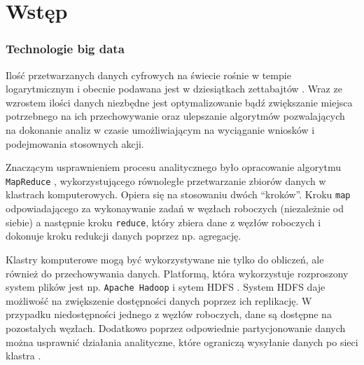 \documentclass[
  letterpaper,
  DIV=11,
  numbers=noendperiod]{scrreprt}
\renewcommand*\contentsname{Spis treści}
\newcommand\contentsname{Spis treści}
\begin{document}
\renewcommand*\contentsname{Spis treści}
{
\hypersetup{linkcolor=}
\setcounter{tocdepth}{2}
\tableofcontents
}
\part{Wstęp}

\hypertarget{technologie-big-data}{%
\section*{Technologie big data}\label{technologie-big-data}}


Ilość przetwarzanych danych cyfrowych na świecie rośnie w tempie
logarytmicznym i obecnie podawana jest w dziesiątkach zettabajtów
\autocite{bartley_2022}. Wraz ze wzrostem ilości danych niezbędne jest
optymalizowanie bądź zwiększanie miejsca potrzebnego na ich
przechowywanie oraz ulepszanie algorytmów pozwalających na dokonanie
analiz w czasie umożliwiającym na wyciąganie wniosków i podejmowania
stosownych akcji.

Znaczącym usprawnieniem procesu analitycznego było opracowanie algorytmu
\texttt{MapReduce} \autocite{dean_ghhemawat_2010}, wykorzystującego
równoległe przetwarzanie zbiorów danych w klastrach komputerowych.
Opiera się na stosowaniu dwóch ``kroków''. Kroku \texttt{map}
odpowiadającego za wykonaywanie zadań w węzłach roboczych (niezależnie
od siebie) a następnie kroku \texttt{reduce}, który zbiera dane z węzłów
roboczych i dokonuje kroku redukcji danych poprzez np. agregację.

Klastry komputerowe mogą być wykorzystywane nie tylko do obliczeń, ale
również do przechowywania danych. Platformą, która wykorzystuje
rozproszony system plików jest np. \texttt{Apache\ Hadoop} i sytem HDFS
\autocite{apache_hadoop}. System HDFS daje możliwość na zwiększenie
dostępności danych poprzez ich replikację. W przypadku niedostępności
jednego z węzłów roboczych, dane są dostępne na pozostałych węzłach.
Dodatkowo poprzez odpowiednie partycjonowanie danych można usprawnić
działania analityczne, które ograniczą wysyłanie danych po sieci klastra
\autocite{navarro_2017}.
\end{document}
